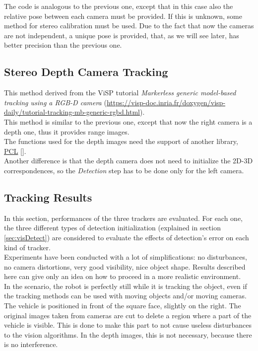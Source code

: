 The code is analogous to the previous one, except that in this case also the relative pose between each camera must be provided. If this is unknown, some method for stereo calibration must be used. Due to the fact that now the cameras are not independent, a unique pose is provided, that, as we will see later, has better precision than the previous one.

\subsection{Stereo Depth Camera Tracking}
\label{subsec:depthTrack}
This method derived from the ViSP tutorial \textit{Markerless generic model-based tracking using a RGB-D camera} (\url{https://visp-doc.inria.fr/doxygen/visp-daily/tutorial-tracking-mb-generic-rgbd.html}).\\

This method is similar to the previous one, except that now the right camera is a depth one, thus it provides range images.\\
The functions used for the depth images need the support of another library, \href{http://www.pointclouds.org/}{PCL} [\cite{pclLib}].\\
Another difference is that the depth camera does not need to initialize the 2D-3D correspondences, so the \textit{Detection} step has to be done only for the left camera.

\subsection{Tracking Results}
\label{subsec:trackResult}

In this section, performances of the three trackers are evaluated. For each one, the three different types of detection initialization (explained in section \ref{sec:visDetect}) are considered to evaluate the effects of detection's error on each kind of tracker.\\

Experiments have been conducted with a lot of simplifications: no disturbances, no camera distortions, very good visibility, nice object shape. Results described here can give only an idea on how to proceed in a more realistic environment.\\

In the scenario, the robot is perfectly still while it is tracking the object, even if the tracking methods can be used with moving objects and/or moving cameras. The vehicle is positioned in front of the square face, slightly on the right. The original images taken from cameras are cut to delete a region where a part of the vehicle is visible. This is done to make this part to not cause useless disturbances to the vision algorithms. In the depth images, this is not necessary, because there is no interference.\\

